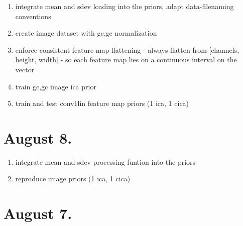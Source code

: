 \documentclass{article}
\begin{document}
\begin{enumerate}
	\item integrate mean and sdev loading into the priors, adapt data-filenaming conventions
	\item create image dataset with gc,gc normalization
	\item enforce consistent feature map flattening - always flatten from [channels, height, width] - so each feature map lies on a continuous interval on the vector
	\item train gc,gc image ica prior
	\item train and test conv1lin feature map priors (1 ica, 1 cica)
\end{enumerate}

\section{August 8.}

\begin{enumerate}
	\item integrate mean and sdev processing funtion into the priors
	\item reproduce image priors (1 ica, 1 cica)
\end{enumerate}


\section*{August 7.}
\end{document}
